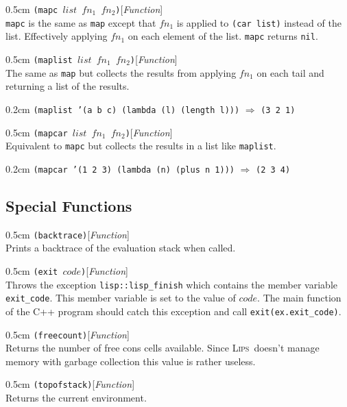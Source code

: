 \documentclass[a4paper]{article}
\newcommand{\lips}{\textsc{Lips}}
\newcommand{\lisp}[1]{\texttt{#1}}
\newcommand{\NIL}{\lisp{nil}}
\newcommand{\cpp}[1]{\texttt{#1}}
\newenvironment{defun}[2]{\begin{adjustwidth}{0.5cm}{}
    {\hspace*{-0.5cm}\lisp{#2}\hfill[\textit{#1}]\\}}
               {\end{adjustwidth}}
\newcommand{\example}[2]{
  \begin{adjustwidth}{0.2cm}{}
    \lisp{#1} $\Rightarrow$ \lisp{#2}
  \end{adjustwidth}
}
\begin{document}
\begin{defun}{Function}{(mapc $list$ $fn_{1}$ $fn_{2}$)}
  \lisp{mapc} is the same as \lisp{map} except that $fn_{1}$ is
  applied to \lisp{(car list)} instead of the list. Effectively
  applying $fn_{1}$ on each element of the list. \lisp{mapc} returns
  \NIL.
\end{defun}


\begin{defun}{Function}{(maplist $list$ $fn_{1}$ $fn_{2}$)}
  The same as \lisp{map} but collects the results from applying
  $fn_{1}$ on each tail and returning a list of the results.

  \example{(maplist '(a b c) (lambda (l) (length l)))}{(3 2 1)}
\end{defun}

\begin{defun}{Function}{(mapcar $list$ $fn_{1}$ $fn_{2}$)}
  Equivalent to \lisp{mapc} but collects the results in a list like
  \lisp{maplist}.

  \example{(mapcar '(1 2 3) (lambda (n) (plus n 1)))}{(2 3 4)}
\end{defun}

\subsection{Special Functions}

\begin{defun}{Function}{(backtrace)}
  Prints a backtrace of the evaluation stack when called.
\end{defun}

\begin{defun}{Function}{(exit $code$)}
  Throws the exception \cpp{lisp::lisp\_finish} which contains the
  member variable \cpp{exit\_code}.  This member variable is set to
  the value of $code$. The main function of the C++ program should
  catch this exception and call \cpp{exit(ex.exit\_code)}.
\end{defun}

\begin{defun}{Function}{(freecount)}
  Returns the number of free cons cells available. Since
  \lips\ doesn't manage memory with garbage collection this value is
  rather useless.
\end{defun}

\begin{defun}{Function}{(topofstack)}
  Returns the current environment.
\end{defun}
\end{document}
